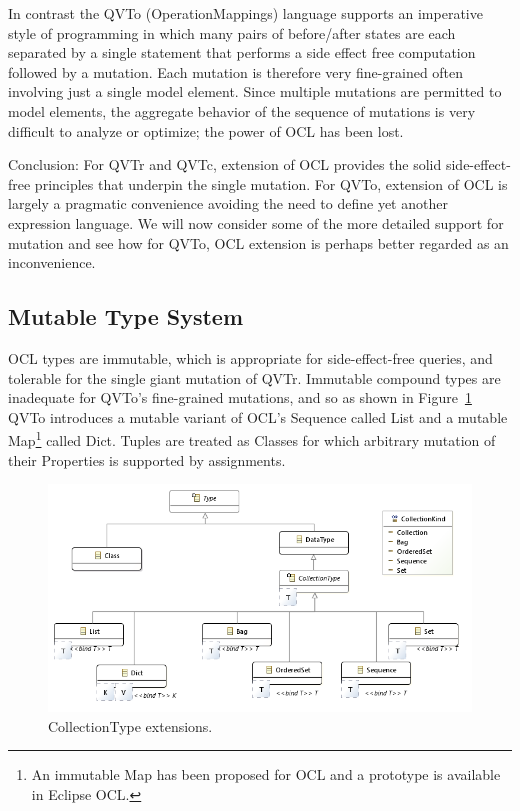 \documentclass{llncs}
\begin{document}
In contrast the QVTo (OperationMappings) language supports an imperative style of programming in which many pairs of before/after states are each separated by a single statement that performs a side effect free computation followed by a mutation. Each mutation is therefore very fine-grained often involving just a single model element. Since multiple mutations are permitted to model elements, the aggregate behavior of the sequence of mutations is very difficult to analyze or optimize; the power of OCL has been lost.
 
Conclusion: For QVTr and QVTc, extension of OCL provides the solid side-effect-free principles that underpin the single mutation. For QVTo, extension of OCL is largely a pragmatic convenience avoiding the need to define yet another expression language.  We will now consider some of the more detailed support for mutation and see how for QVTo, OCL extension is perhaps better regarded as an inconvenience.

\subsection{Mutable Type System}
  
OCL types are immutable, which is appropriate for side-effect-free queries, and tolerable for the single giant mutation of QVTr. Immutable compound types are inadequate for QVTo's fine-grained mutations, and so as shown in Figure~\ref{fig:Extensionsclassdiagram} QVTo introduces a mutable variant of OCL's Sequence called List and a mutable Map\footnote{An immutable Map has been proposed for OCL and a prototype is available in Eclipse OCL.} called Dict. Tuples are treated as Classes for which arbitrary mutation of their Properties is supported by assignments.

\begin{figure}[h]
	\centering
	\includegraphics[width=1.0\textwidth]{Extensionsclassdiagram.png}
	\caption{CollectionType extensions.}
	\label{fig:Extensionsclassdiagram}
\end{figure}
\end{document}
